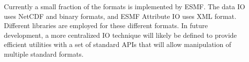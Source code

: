 
Currently a small fraction of the formats is implemented by ESMF.  
The data IO uses NetCDF and binary formats, and ESMF Attribute
IO uses XML format.  Different libraries are employed for these 
different formats.  In future development, a more centralized IO technique
will likely be defined to provide efficient utilities with a set of standard
APIs that will allow manipulation of multiple standard formats.
